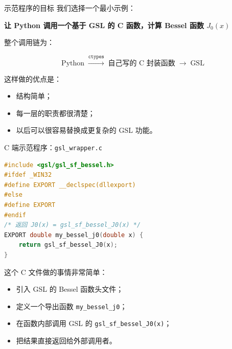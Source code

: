 \documentclass[aspectratio=169,11pt]{ctexbeamer}
\begin{document}
\begin{frame}{示范程序的目标}
我们选择一个最小示例：

\begin{center}
\textbf{让 Python 调用一个基于 GSL 的 C 函数，计算 Bessel 函数 \(J_0(x)\)}
\end{center}

\vspace{0.5em}
整个调用链为：

\[
\text{Python}
\;\xrightarrow{\texttt{ctypes}}\;
\text{自己写的 C 封装函数}
\;\xrightarrow{}\;
\text{GSL}
\]

\vspace{0.5em}
这样做的优点是：

\begin{itemize}
  \item 结构简单；
  \item 每一层的职责都很清楚；
  \item 以后可以很容易替换成更复杂的 GSL 功能。
\end{itemize}
\end{frame}

\begin{frame}[fragile]{C 端示范程序：\texttt{gsl\_wrapper.c}}
\begin{lstlisting}[language=C]
#include <gsl/gsl_sf_bessel.h>
#ifdef _WIN32
#define EXPORT __declspec(dllexport)
#else
#define EXPORT
#endif
/* 返回 J0(x) = gsl_sf_bessel_J0(x) */
EXPORT double my_bessel_j0(double x) {
    return gsl_sf_bessel_J0(x);
}
\end{lstlisting}

这个 C 文件做的事情非常简单：

\begin{itemize}
  \item 引入 GSL 的 Bessel 函数头文件；
  \item 定义一个导出函数 \texttt{my\_bessel\_j0}；
  \item 在函数内部调用 GSL 的 \texttt{gsl\_sf\_bessel\_J0(x)}；
  \item 把结果直接返回给外部调用者。
\end{itemize}
\end{frame}
\end{document}
